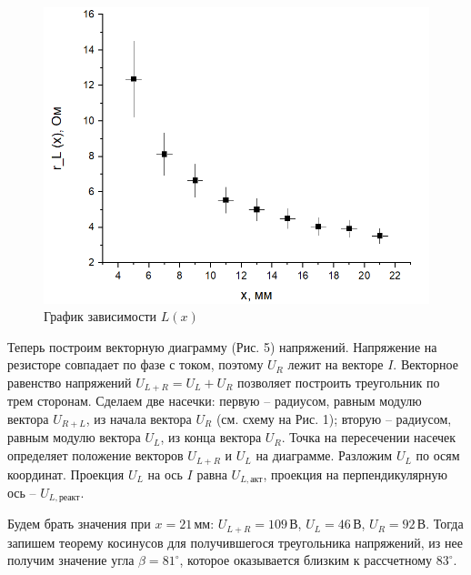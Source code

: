 \documentclass[a4paper, fontsize = 14pt]{article}
\begin{document}
\begin{figure}
	\centering
	\includegraphics[scale=0.7]{lab48ris3.png}
	\caption{График зависимости $L(x)$}
\end{figure}

\newpage

Теперь построим векторную диаграмму (Рис. 5) напряжений. Напряжение на резисторе совпадает по фазе с током, поэтому $U_R$ лежит на векторе $I$. Векторное равенство напряжений $U_{L+R} = U_L + U_R$ позволяет построить треугольник по трем сторонам. Сделаем две насечки: первую -- радиусом, равным модулю вектора $U_{R+L}$, из начала вектора $U_R$ (см. схему на Рис. 1); вторую -- радиусом, равным модулю вектора $U_L$, из конца вектора $U_R$. Точка на пересечении насечек определяет положение векторов $U_{L+R}$ и $U_L$ на диаграмме. Разложим $U_L$ по осям координат. Проекция $U_L$ на ось $I$ равна $U_{L, акт}$, проекция на перпендикулярную ось -- $U_{L, реакт}$. 

Будем брать значения при $x = 21 \, мм$: $U_{L+R} = 109 \, В$, $U_L = 46 \, В$, $U_R = 92 \, В$. Тогда запишем теорему косинусов для получившегося треугольника напряжений, из нее получим значение угла $\beta = 81 ^\circ$, которое оказывается близким к рассчетному $83 ^\circ$.
\end{document}
